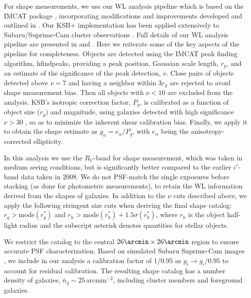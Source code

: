 \documentclass[iop,twocolumn]{emulateapj}
\def\RC{\mbox{$R_\mathrm{C}$}}
\begin{document}
For shape measurements, we use our
WL analysis pipeline which is based on the IMCAT package \citep[KSB
hereafter]{KSB}, incorporating modifications and
improvements developed and outlined in \citet{Umetsu2010}.
Our KSB+ implementation has been applied extensively to
Subaru/Suprime-Cam cluster observations
\citep[e.g.,][]{Coe2012,Merten2015,Medezinski2010,
Medezinski2011,Medezinski2013,Okabe+Umetsu2008,UB2008,
Umetsu+2009,Umetsu2010,Umetsu+2011,Umetsu+2011_stack,Umetsu+2012,Zitrin+2011_A383,Zitrin2013}. 
Full details of our WL analysis pipeline are presented in
\cite{Umetsu+2012} and \cite{Umetsu2014}. Here we reiterate some of the key aspects of the pipeline for completeness.
%
Objects are detected using the {\sc IMCAT}  peak finding algorithm, {\sc hfindpeaks}, providing a peak position, Gaussian scale length, $r_g$, and an estimate of the significance of the peak detection, $\nu$.  Close pairs of objects detected above  $\nu=7$ and having a neighbor within $3r_g$ are rejected to avoid shape measurement bias. Then all objects with  $\nu<10$ are excluded from the analysis.  KSB's isotropic correction factor, $P_g$, is calibrated as a function of object size ($r_g$) and magnitude,  
using galaxies detected with high significance $\nu>30$
\citep{Umetsu2010}, so as to minimize the inherent shear calibration bias. Finally, we apply it to obtain the shape estimate as $g_\alpha=e_\alpha/P_g$, with $e_\alpha$ being the      anisotropy-corrected ellipticity.




In this analysis we use the $\RC$-band for shape measurement, which was taken in medium seeing 
conditions, but is significantly better compared to the earlier
$i'$-band data taken in 2008.  
We do not PSF-match the single exposures before stacking (as done for
photometric measurements), to retain the WL
information derived from the shapes of galaxies. 
In addition to the $\nu$ cuts described above,
we apply the following stringent size cuts \citep{Umetsu+2012}
when deriving the final shape catalog:
$r_g > \mathrm{mode}(r_g^*)$ and 
$r_h > \mathrm{mode}(r_h^*) + 1.5\sigma(r_h^*)$,
where $r_h$ is the object half-light radius  and the subscript asterisk
denotes quantities for stellar objects.

We restrict the catalog to the central $26\arcmin\times26\arcmin$ region
to ensure accurate PSF characterization.
%
Based on simulated Subaru Suprime-Cam images \citep[see Section 3.2 of][]{Oguri2012,Massey2007},
we include in our analysis a calibration factor of $1/0.95$ as
$g_i\to g_i/0.95$ to account for residual calibration.
The resulting shape catalog has a number density of galaxies, $\bar{n}_g\sim25$\,arcmin$^{-2}$, including cluster members and foreground galaxies.
\end{document}
